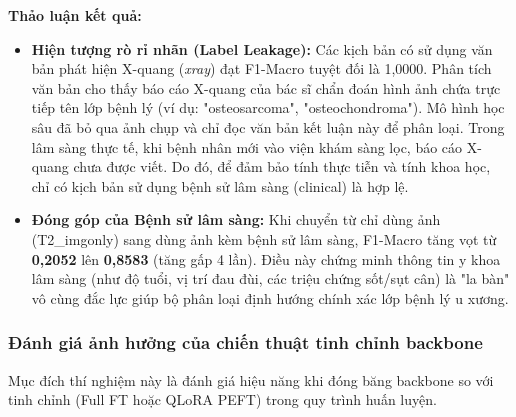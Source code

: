 \textbf{Thảo luận kết quả:}
\begin{itemize}
    \item \textbf{Hiện tượng rò rỉ nhãn (Label Leakage):} Các kịch bản có sử dụng văn bản phát hiện X-quang (\textit{xray}) đạt F1-Macro tuyệt đối là 1,0000. Phân tích văn bản cho thấy báo cáo X-quang của bác sĩ chẩn đoán hình ảnh chứa trực tiếp tên lớp bệnh lý (ví dụ: "osteosarcoma", "osteochondroma"). Mô hình học sâu đã bỏ qua ảnh chụp và chỉ đọc văn bản kết luận này để phân loại. Trong lâm sàng thực tế, khi bệnh nhân mới vào viện khám sàng lọc, báo cáo X-quang chưa được viết. Do đó, để đảm bảo tính thực tiễn và tính khoa học, chỉ có kịch bản sử dụng bệnh sử lâm sàng (clinical) là hợp lệ.
    \item \textbf{Đóng góp của Bệnh sử lâm sàng:} Khi chuyển từ chỉ dùng ảnh (T2\_imgonly) sang dùng ảnh kèm bệnh sử lâm sàng, F1-Macro tăng vọt từ \textbf{0,2052} lên \textbf{0,8583} (tăng gấp 4 lần). Điều này chứng minh thông tin y khoa lâm sàng (như độ tuổi, vị trí đau đùi, các triệu chứng sốt/sụt cân) là "la bàn" vô cùng đắc lực giúp bộ phân loại định hướng chính xác lớp bệnh lý u xương.
\end{itemize}

\subsubsection{Đánh giá ảnh hưởng của chiến thuật tinh chỉnh backbone}
Mục đích thí nghiệm này là đánh giá hiệu năng khi đóng băng backbone so với tinh chỉnh (Full FT hoặc QLoRA PEFT) trong quy trình huấn luyện.

\begin{table}[htbp]
\centering
{}
\end{table}

